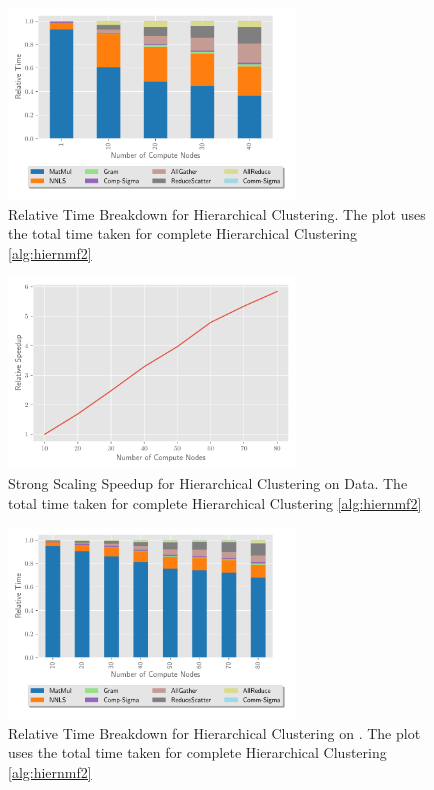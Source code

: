 \begin{figure}
\begin{center}
\includegraphics[height=2in, width=\columnwidth]{plots/synthetic_hier_strongscaling.pdf}
\caption{Relative Time Breakdown for Hierarchical Clustering. The plot uses the total time taken for complete Hierarchical Clustering \cref{alg:hiernmf2}}
\label{fig:synhierstrongscaling}
\end{center}
\end{figure}

\begin{figure}
\begin{center}
\includegraphics[height=2in, width=\columnwidth]{plots/realworld_hierarchical_speedup.pdf}
\caption{Strong Scaling Speedup for Hierarchical Clustering on \image{} Data. The total time taken for complete Hierarchical Clustering \cref{alg:hiernmf2}}
\label{fig:rwhierspeedup}
\end{center}
\end{figure}

\begin{figure}
\begin{center}
\includegraphics[height=2in, width=\columnwidth]{plots/realworld_hier_strongscaling.pdf}
\caption{Relative Time Breakdown for Hierarchical Clustering on \image{}. The plot uses the total time taken for complete Hierarchical Clustering \cref{alg:hiernmf2}}
\label{fig:rwhierstrongscaling}
\end{center}
\end{figure}

